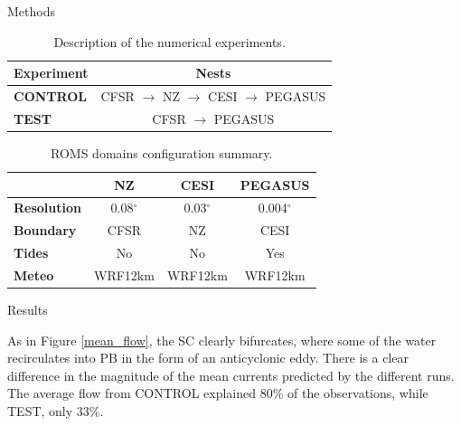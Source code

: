 \documentclass[final]{beamer}
\newlength{\onecolwid}
\newlength{\twocolwid}
\begin{document}
\begin{frame}[t]
\begin{columns}[t]
\begin{column}{\twocolwid}
\begin{columns}[t,totalwidth=\twocolwid]
\begin{column}{\onecolwid}
\begin{block}{Methods}
\begin{small}
            \begin{table}
            \vspace{2ex}
            \begin{tabular}{l c}
            \toprule
            \textbf{Experiment} & \textbf{Nests} \\
            \midrule
            \textbf{CONTROL} & CFSR $\rightarrow$ NZ $\rightarrow$ CESI $\rightarrow$ PEGASUS \\
            \textbf{TEST}    & CFSR $\rightarrow$ PEGASUS \\
            \bottomrule
            \end{tabular}
            \caption{\label{experiments} Description of the numerical experiments.}
            \end{table}


            \begin{table}
            \vspace{2ex}
            \begin{tabular}{l c c c}
            \toprule
                                & \textbf{NZ}  & \textbf{CESI} & \textbf{PEGASUS} \\
            \midrule
            \textbf{Resolution} & 0.08$^\circ$ & 0.03$^\circ$ & 0.004$^\circ$ \\
            \textbf{Boundary}   & CFSR         & NZ           & CESI          \\
            \textbf{Tides}      & No           & No           & Yes           \\
            \textbf{Meteo}      & WRF12km      & WRF12km      & WRF12km        \\
            \bottomrule
            \end{tabular}
            \caption{\label{roms_configs} ROMS domains configuration summary.}
            \end{table}

            \end{small}


            \end{block}

            \begin{block}{Results}

            As in Figure \ref{mean_flow}, the SC clearly bifurcates, where some of the water recirculates into PB in the form of an anticyclonic eddy. There is a clear difference in the magnitude of the mean currents predicted by the different runs. The average flow from CONTROL explained 80\% of the observations, while TEST, only 33\%. 


\end{block}
\end{column}
\end{columns}
\end{column}
\end{columns}
\end{frame}
\end{document}
